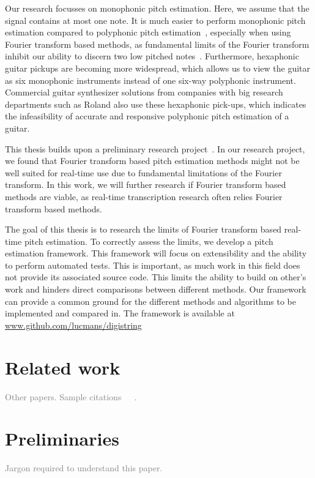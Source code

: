 \documentclass[10pt,twocolumn]{article}
\begin{document}
Our research focusses on monophonic pitch estimation. Here, we assume that the signal contains at most one note. It is much easier to perform monophonic pitch estimation compared to polyphonic pitch estimation~\cite{monotopoly}, especially when using Fourier transform based methods, as fundamental limits of the Fourier transform inhibit our ability to discern two low pitched notes~\cite{nopoly}. Furthermore, hexaphonic guitar pickups are becoming more widespread, which allows us to view the guitar as six monophonic instruments instead of one six-way polyphonic instrument. Commercial guitar synthesizer solutions from companies with big research departments such as Roland also use these hexaphonic pick-ups, which indicates the infeasibility of accurate and responsive polyphonic pitch estimation of a guitar.

This thesis builds upon a preliminary research project~\cite{ik}. In our research project, we found that Fourier transform based pitch estimation methods might not be well suited for real-time use due to fundamental limitations of the Fourier transform. In this work, we will further research if Fourier transform based methods are viable, as real-time transcription research often relies Fourier transform based methods.

The goal of this thesis is to research the limits of Fourier transform based real-time pitch estimation. To correctly assess the limits, we develop a pitch estimation framework. This framework will focus on extensibility and the ability to perform automated tests. This is important, as much work in this field does not provide its associated source code. This limits the ability to build on other's work and hinders direct comparisons between different methods. Our framework can provide a common ground for the different methods and algorithms to be implemented and compared in. The framework is available at \url{www.github.com/lucmans/digistring}


\section{Related work}
\textcolor{gray}{Other papers. Sample citations~\cite{mono}~\cite{window}~\cite{twotimes}.}


\section{Preliminaries}
\textcolor{gray}{Jargon required to understand this paper.}
\end{document}
